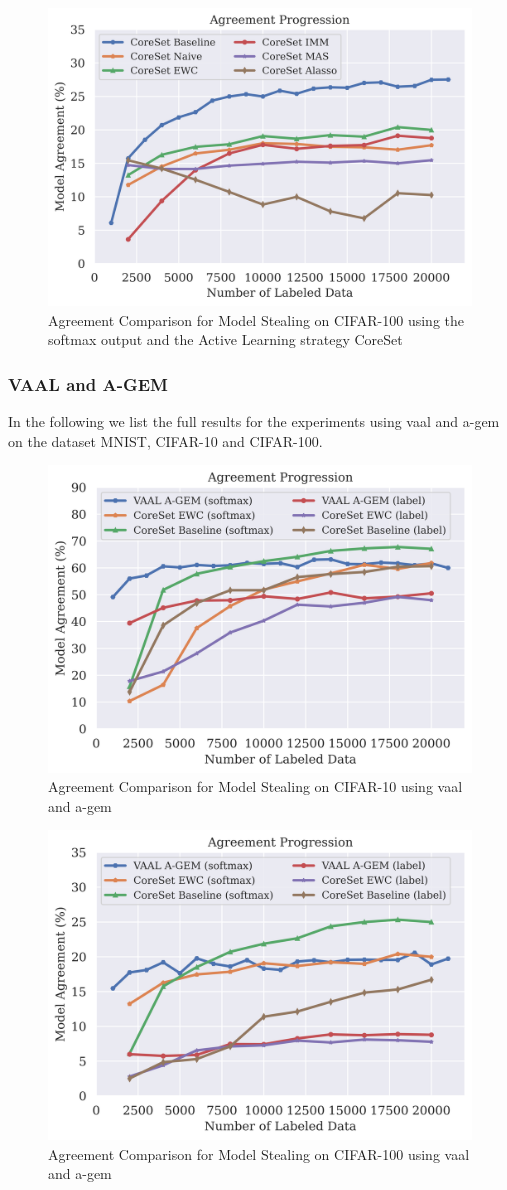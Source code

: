 \begin{figure}[!htb]
    \centering
    \includegraphics[width=0.5\linewidth]{images/results_CALMS/cifar100_softmax_coreset.png}
    \caption{Agreement Comparison for Model Stealing on CIFAR-100 using the softmax output and the Active Learning strategy CoreSet}
    \label{fig:CALMSCIFAR100SoftmaxCoreSet}
\end{figure}

\subsubsection{VAAL and A-GEM}
\label{sec:Appendix:CALMS:VAALAGEM}
In the following we list the full results for the experiments using \gls{vaal} and \gls{a-gem} on the dataset MNIST, CIFAR-10 and CIFAR-100.
\begin{figure}[!htb]
    \centering
    \includegraphics[width=0.5\linewidth]{images/results_CALMS/cifar_vaal_agem.png}
    \caption{Agreement Comparison for Model Stealing on CIFAR-10 using \gls{vaal} and \gls{a-gem}}
    \label{fig:CALMScifarVAAL_AGEM}
\end{figure}

\begin{figure}[!htb]
    \centering
    \includegraphics[width=0.5\linewidth]{images/results_CALMS/cifar100_vaal_agem.png}
    \caption{Agreement Comparison for Model Stealing on CIFAR-100 using \gls{vaal} and \gls{a-gem}}
    \label{fig:CALMScifar100VAAL_AGEM}
\end{figure}

